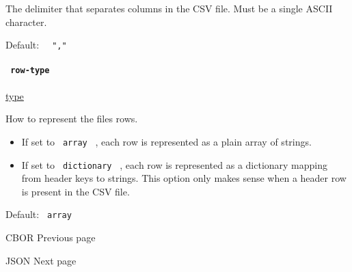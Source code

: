 The delimiter that separates columns in the CSV file. Must be a single
ASCII character.

Default: \texttt{\ }{\texttt{\ ","\ }}\texttt{\ }

\paragraph{\texorpdfstring{\texttt{\ row-type\ }}{ row-type }}\label{definitions-decode-row-type}

\href{/docs/reference/foundations/type/}{type}

How to represent the file\textquotesingle s rows.

\begin{itemize}
\tightlist
\item
  If set to \texttt{\ array\ } , each row is represented as a plain
  array of strings.
\item
  If set to \texttt{\ dictionary\ } , each row is represented as a
  dictionary mapping from header keys to strings. This option only makes
  sense when a header row is present in the CSV file.
\end{itemize}

Default: \texttt{\ array\ }

\href{/docs/reference/data-loading/cbor/}{\pandocbounded{}}

{ CBOR } { Previous page }

\href{/docs/reference/data-loading/json/}{\pandocbounded{}}

{ JSON } { Next page }
